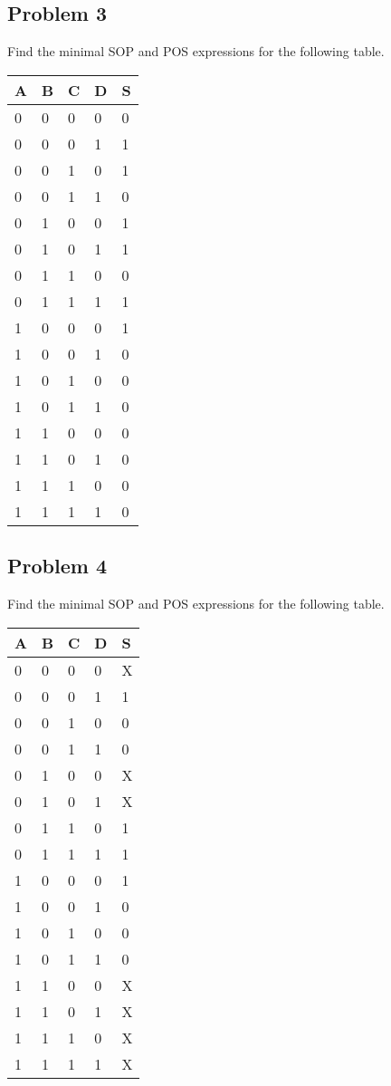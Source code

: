 \documentclass{article}
\begin{document}
\subsection*{Problem 3}
Find the minimal SOP and POS expressions for the following table.
\begin{table}[!h]
\begin{tabular}{|l|l|l|l|l|}
\hline
A & B & C & D & S \\ \hline
0 & 0 & 0 & 0 & 0 \\ \hline
0 & 0 & 0 & 1 & 1 \\ \hline
0 & 0 & 1 & 0 & 1 \\ \hline
0 & 0 & 1 & 1 & 0 \\ \hline
0 & 1 & 0 & 0 & 1 \\ \hline
0 & 1 & 0 & 1 & 1 \\ \hline
0 & 1 & 1 & 0 & 0 \\ \hline
0 & 1 & 1 & 1 & 1 \\ \hline
1 & 0 & 0 & 0 & 1 \\ \hline
1 & 0 & 0 & 1 & 0 \\ \hline
1 & 0 & 1 & 0 & 0 \\ \hline
1 & 0 & 1 & 1 & 0 \\ \hline
1 & 1 & 0 & 0 & 0 \\ \hline
1 & 1 & 0 & 1 & 0 \\ \hline
1 & 1 & 1 & 0 & 0 \\ \hline
1 & 1 & 1 & 1 & 0 \\ \hline
\end{tabular}
\end{table}

\subsection*{Problem 4}
Find the minimal SOP and POS expressions for the following table.
\begin{table}[!h]
\begin{tabular}{|l|l|l|l|l|}
\hline
A & B & C & D & S \\ \hline
0 & 0 & 0 & 0 & X \\ \hline
0 & 0 & 0 & 1 & 1 \\ \hline
0 & 0 & 1 & 0 & 0 \\ \hline
0 & 0 & 1 & 1 & 0 \\ \hline
0 & 1 & 0 & 0 & X \\ \hline
0 & 1 & 0 & 1 & X \\ \hline
0 & 1 & 1 & 0 & 1 \\ \hline
0 & 1 & 1 & 1 & 1 \\ \hline
1 & 0 & 0 & 0 & 1 \\ \hline
1 & 0 & 0 & 1 & 0 \\ \hline
1 & 0 & 1 & 0 & 0 \\ \hline
1 & 0 & 1 & 1 & 0 \\ \hline
1 & 1 & 0 & 0 & X \\ \hline
1 & 1 & 0 & 1 & X \\ \hline
1 & 1 & 1 & 0 & X \\ \hline
1 & 1 & 1 & 1 & X \\ \hline
\end{tabular}
\end{table}
\newpage 
\end{document}
